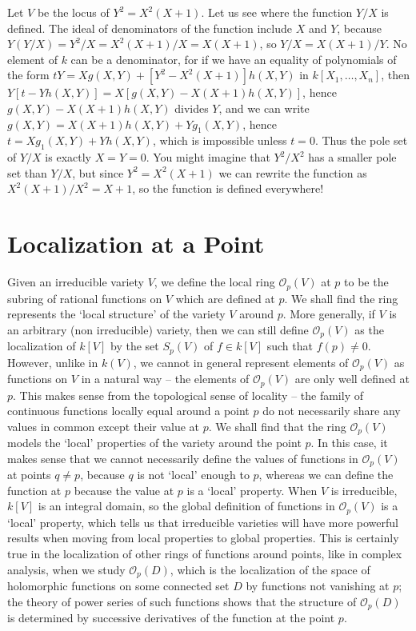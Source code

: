\begin{example}
    Let $V$ be the locus of $Y^2 = X^2(X+1)$. Let us see where the function $Y/X$ is defined. The ideal of denominators of the function include $X$ and $Y$, because $Y(Y/X) = Y^2/X = X^2(X+1)/X = X(X+1)$, so $Y/X = X(X+1)/Y$. No element of $k$ can be a denominator, for if we have an equality of polynomials of the form $tY = Xg(X,Y) + [Y^2 - X^2(X+1)]h(X,Y)$ in $k[X_1, \dots, X_n]$, then $Y[t - Yh(X,Y)] = X[g(X,Y) - X(X+1)h(X,Y)]$, hence $g(X,Y) - X(X+1)h(X,Y)$ divides $Y$, and we can write $g(X,Y) = X(X+1)h(X,Y) + Yg_1(X,Y)$, hence $t = Xg_1(X,Y) + Yh(X,Y)$, which is impossible unless $t = 0$. Thus the pole set of $Y/X$ is exactly $X = Y = 0$. You might imagine that $Y^2/X^2$ has a smaller pole set than $Y/X$, but since $Y^2 = X^2(X+1)$ we can rewrite the function as $X^2(X+1)/X^2 = X+1$, so the function is defined everywhere!
\end{example}

\section{Localization at a Point}

Given an irreducible variety $V$, we define the local ring $\mathcal{O}_p(V)$ at $p$ to be the subring of rational functions on $V$ which are defined at $p$. We shall find the ring represents the `local structure' of the variety $V$ around $p$. More generally, if $V$ is an arbitrary (non irreducible) variety, then we can still define $\mathcal{O}_p(V)$ as the localization of $k[V]$ by the set $S_p(V)$ of $f \in k[V]$ such that $f(p) \neq 0$. However, unlike in $k(V)$, we cannot in general represent elements of $\mathcal{O}_p(V)$ as functions on $V$ in a natural way -- the elements of $\mathcal{O}_p(V)$ are only well defined at $p$. This makes sense from the topological sense of locality -- the family of continuous functions locally equal around a point $p$ do not necessarily share any values in common except their value at $p$. We shall find that the ring $\mathcal{O}_p(V)$ models the `local' properties of the variety around the point $p$. In this case, it makes sense that we cannot necessarily define the values of functions in $\mathcal{O}_p(V)$ at points $q \neq p$, because $q$ is not `local' enough to $p$, whereas we can define the function at $p$ because the value at $p$ is a `local' property. When $V$ is irreducible, $k[V]$ is an integral domain, so the global definition of functions in $\mathcal{O}_p(V)$ is a `local' property, which tells us that irreducible varieties will have more powerful results when moving from local properties to global properties. This is certainly true in the localization of other rings of functions around points, like in complex analysis, when we study $\mathcal{O}_p(D)$, which is the localization of the space of holomorphic functions on some connected set $D$ by functions not vanishing at $p$; the theory of power series of such functions shows that the structure of $\mathcal{O}_p(D)$ is determined by successive derivatives of the function at the point $p$.

